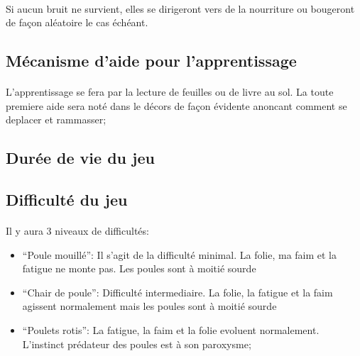 \documentclass[a4paper,10pt]{article}
\begin{document}
			\paragraph{} Si aucun bruit ne survient, elles se dirigeront vers 
de la nourriture ou bougeront de façon aléatoire le cas échéant.




		\subsection{Mécanisme d'aide pour l'apprentissage}
			\paragraph{} L'apprentissage se fera par la lecture de feuilles ou 
de livre au sol. La toute premiere aide sera noté dans le décors de façon 
évidente anoncant comment se deplacer et rammasser;

		\subsection{Durée de vie du jeu}
			\paragraph{}
		\subsection{Difficulté du jeu}
			\paragraph{} Il y aura 3 niveaux de difficultés:
				\begin{itemize}
					\item ``Poule mouillé'': Il s'agit de la difficulté 
minimal. La folie, ma faim et la fatigue ne monte pas. Les poules sont à moitié 
sourde  
					\item ``Chair de poule'': Difficulté intermediaire. La 
folie, la fatigue et la faim agissent normalement mais les poules sont à moitié 
sourde
					\item ``Poulets rotis'': La fatigue, la faim et la folie 
evoluent normalement. L'instinct prédateur des poules est à son paroxysme;
				\end{itemize}
		
		
		\subsection{}
		
\end{document}

